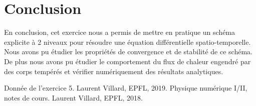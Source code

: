 \documentclass[a4paper,12pt,oneside]{article}
\begin{document}
\section{Conclusion}

En conclusion, cet exercice nous a permis de mettre en pratique un schéma explicite à 2 niveaux pour résoudre une équation différentielle spatio-temporelle. Nous avons pu étudier les propriétés de convergence et de stabilité de ce schéma. De plus nous avons pu étudier le comportement du flux de chaleur engendré par des corps tempérés et vérifier numériquement des résultats analytiques.

\begin{thebibliography}{99}
Donnée de l'exercice 5. Laurent Villard, EPFL, 2019.
Physique numérique I/II, notes de cours. Laurent Villard, EPFL, 2018.
\end{thebibliography}
 
\end{document}
